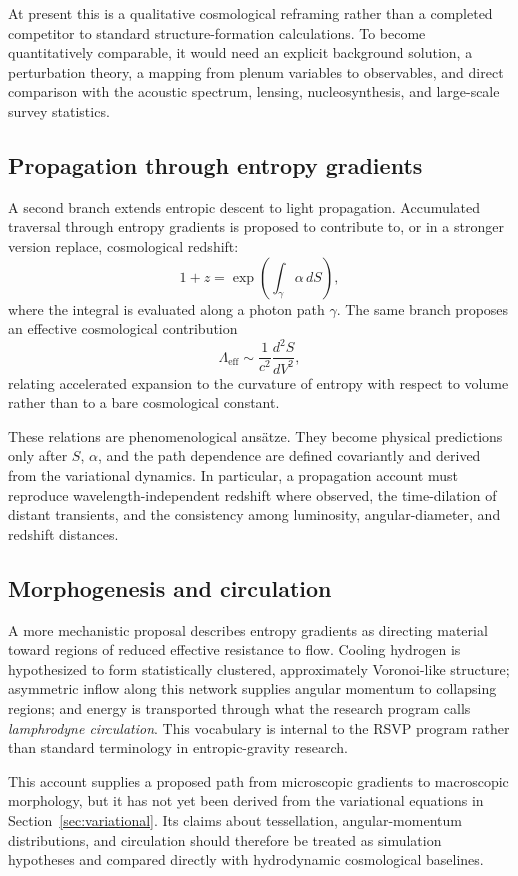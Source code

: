 \documentclass[11pt]{article}
\begin{document}
At present this is a qualitative cosmological reframing rather than a completed competitor to standard structure-formation calculations. To become quantitatively comparable, it would need an explicit background solution, a perturbation theory, a mapping from plenum variables to observables, and direct comparison with the acoustic spectrum, lensing, nucleosynthesis, and large-scale survey statistics.

\subsection{Propagation through entropy gradients}

A second branch extends entropic descent to light propagation. Accumulated traversal through entropy gradients is proposed to contribute to, or in a stronger version replace, cosmological redshift:
\[
1+z=\exp\!\left(\int_\gamma \alpha\,dS\right),
\]
where the integral is evaluated along a photon path $\gamma$. The same branch proposes an effective cosmological contribution
\[
\Lambda_{\mathrm{eff}}
\sim \frac{1}{c^2}\frac{d^2S}{dV^2},
\]
relating accelerated expansion to the curvature of entropy with respect to volume rather than to a bare cosmological constant.

These relations are phenomenological ans\"atze. They become physical predictions only after $S$, $\alpha$, and the path dependence are defined covariantly and derived from the variational dynamics. In particular, a propagation account must reproduce wavelength-independent redshift where observed, the time-dilation of distant transients, and the consistency among luminosity, angular-diameter, and redshift distances.

\subsection{Morphogenesis and circulation}

A more mechanistic proposal describes entropy gradients as directing material toward regions of reduced effective resistance to flow. Cooling hydrogen is hypothesized to form statistically clustered, approximately Voronoi-like structure; asymmetric inflow along this network supplies angular momentum to collapsing regions; and energy is transported through what the research program calls \emph{lamphrodyne circulation}. This vocabulary is internal to the RSVP program rather than standard terminology in entropic-gravity research.

This account supplies a proposed path from microscopic gradients to macroscopic morphology, but it has not yet been derived from the variational equations in Section~\ref{sec:variational}. Its claims about tessellation, angular-momentum distributions, and circulation should therefore be treated as simulation hypotheses and compared directly with hydrodynamic cosmological baselines.
\end{document}

